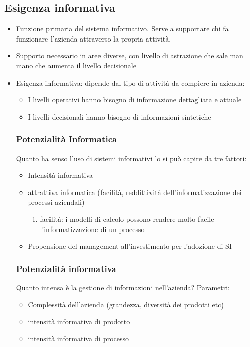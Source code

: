 \subsection{Esigenza informativa}
\begin{itemize}
  \item Funzione primaria del sistema informativo. Serve a supportare chi fa funzionare l'azienda attraverso la propria attività.
  \item Supporto necessario in aree diverse, con livello di astrazione che sale man mano che aumenta il livello decisionale
  \item Esigenza informativa: dipende dal tipo di attività da compiere in azienda:
  \begin{itemize}
    \item I livelli operativi hanno bisogno di informazione dettagliata e attuale
    \item I livelli decisionali hanno bisogno di informazioni sintetiche
  \end{itemize}
  

\subsubsection{Potenzialit\`a Informatica}

Quanto ha senso l'uso di sistemi informativi lo si pu\`o capire da tre fattori:
\begin{itemize}
  \item Intensit\`a informativa
  \item attrattiva informatica (facilit\`a, reddittivit\`a dell'informatizzazione
  dei processi aziendali)
  \begin{enumerate}
    \item facilit\`a: i modelli di calcolo possono rendere molto facile l'informatizzazione
    di un processo
  \end{enumerate}
  \item Propensione del management all'investimento per l'adozione di SI
\end{itemize}
\subsubsection{Potenzialit\`a informativa}
Quanto intensa \`e la gestione di informazioni nell'azienda?
Parametri:
\begin{itemize}
  \item Complessit\`a dell'azienda (grandezza, diversit\`a dei prodotti etc)
  \item intensit\`a informativa di prodotto
  \item intensit\`a informativa di processo
\end{itemize}

\end{itemize}
